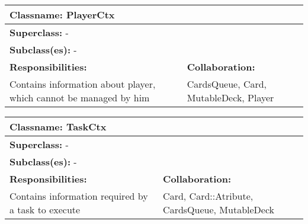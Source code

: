 \begin{table}
    \centering
    \begin{tabular}{|l|l|}
         \toprule
         \multicolumn{2}{|l|}{\textbf{Classname: }PlayerCtx} \\
         \midrule
         \multicolumn{2}{|l|}{\textbf{Superclass: }-} \\
         \multicolumn{2}{|l|}{\textbf{Subclass(es): }-} \\
         \midrule
         \textbf{Responsibilities:} & \textbf{Collaboration:} \\
         Contains information about player, which cannot be managed by him & CardsQueue, Card, MutableDeck, Player \\
         \bottomrule
    \end{tabular}
    \label{tab:my_label}
\end{table}

\begin{table}
    \centering
    \begin{tabular}{|l|l|}
         \toprule
         \multicolumn{2}{|l|}{\textbf{Classname: }TaskCtx} \\
         \midrule
         \multicolumn{2}{|l|}{\textbf{Superclass: }-} \\
         \multicolumn{2}{|l|}{\textbf{Subclass(es): }-} \\
         \midrule
         \textbf{Responsibilities:} & \textbf{Collaboration:} \\
         Contains information required by a task to execute & Card, Card::Atribute, CardsQueue, MutableDeck \\ 
         \bottomrule
    \end{tabular}
    \label{tab:my_label}
\end{table}


